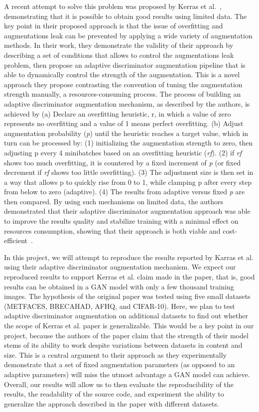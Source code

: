 \documentclass{report}
\begin{document}
A recent attempt to solve this problem was proposed by Kerras et al.~\cite{karras2020training}, demonstrating that it is possible to obtain good results using limited data. The key point in their proposed approach is that the issue of overfitting and augmentations leak can be prevented by applying a wide variety of augmentation methods. In their work, they demonstrate the validity of their approach by describing a set of conditions that allows to control the augmentations leak problem, then propose an adaptive discriminator augmentation pipeline that is able to dynamically control the strength of the augmentation. This is a novel approach they propose contrasting the convention of tuning the augmentation strength manually, a resources-consuming process. The process of building an adaptive discriminator augmentation mechanism, as described by the authors, is achieved by 
(a) Declare an overfitting heuristic, r, in which a value of zero represents no overfitting and a value of 1 means perfect overfitting.
(b) Adjust augmentation probability (\textit{p}) until the heuristic reaches a target value, which in turn can be processed by:
(1) initializing the augmentation strength to zero, then adjusting p every 4 minibatches based on an overfitting heuristic (\textit{rf}).
(2) if \textit{rf} shows too much overfitting, it is countered by a fixed increment of \textit{p} (or fixed decrement if \textit{rf} shows too little overfitting).
(3) The adjustment size is then set in a way that allows p to quickly rise from 0 to 1, while clamping p after every step from below to zero (adaptive).
(4) The results from adaptive versus ﬁxed \textit{p} are then compared.
By using such mechanisms on limited data, the authors demonstrated that their adaptive discriminator augmentation approach was able to improve the results quality and stabilize training with a minimal effect on resources consumption, showing that their approach is both viable and cost-efficient~\cite{karras2020training}.


In this project, we will attempt to reproduce the results reported by Karras et al. using their adaptive discriminator augmentation mechanism. We expect our reproduced results to support Kerras et al. claim made in the paper, that is, good results can be obtained in a GAN model with only a few thousand training images. The hypothesis of the original paper was tested using five small datasets (METFACES, BRECAHAD, AFHQ, and CIFAR-10). Here, we plan to test adaptive discriminator augmentation on additional datasets to find out whether the scope of Kerras et al. paper is generalizable. This would be a key point in our project, because the authors of the paper claim that the strength of their model stems of its ability to work despite variations between datasets in content and size. This is a central argument to their approach as they experimentally demonstrate that a set of ﬁxed augmentation parameters (as opposed to an adaptive parameters) will miss the utmost advantage a GAN model can achieve. Overall, our results will allow us to then evaluate the reproducibility of the results, the readability of the source code, and experiment the ability to generalize the approach described in the paper with different datasets.
\end{document}
